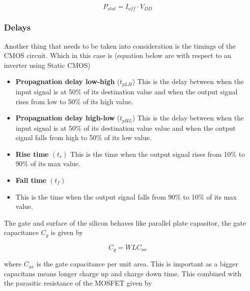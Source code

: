 \begin{equation}
    P_{stat}=I_{off}\cdot V_{DD}
    \label{eq:leakage_power}
\end{equation}

\subsubsection{Delays}
Another thing that needs to be taken into consideration is the timings of the CMOS circuit. Which in this case is (equation below are with respect to an inverter using Static CMOS) \cite{departmentofelectronicsystemsntnu_2023_delay}
\begin{itemize}
    \item \textbf{Propagnation delay low-high} ($t_{pLH}$)
    \subitem This is the delay between when the input signal is at 50\% of its destination value and when the output signal rises from low to 50\% of its high value.
    \item \textbf{Propagnation delay high-low} ($t_{pHL}$)
    \subitem This is the delay between when the input signal is at 50\% of its destination value value and when the output signal falls from high to 50\% of its low value.\cite{wikipediacontributors_2023_signal}
    \item \textbf{Rise time} $\left(t_r\right)$
    \subitem This is the time when the output signal rises from 10\% to 90\% of its max value.
    \item \textbf{Fall time} $\left(t_f\right)$
    \item \subitem This is the time when the output signal falls from 90\% to 10\% of its max value.
\end{itemize}



The gate and surface of the silicon behaves like parallel plate capasitor, the gate capacitance $C_g$ is given by \cite[p. 18]{carusone_2012_analog}

\begin{equation}
    C_g=WLC_{ox}
    \label{eq:gate_capacitance}
\end{equation}

where $C_{ox}$ is the gate capacitance per unit area. This is important as a bigger capacitans means longer charge up and charge down time. This combined with the parasitic resistance of the MOSFET given by \cite{departmentofelectronicsystemsntnu_2023_delay}


